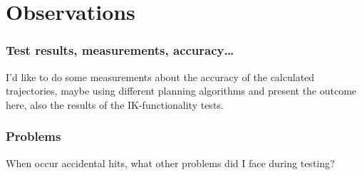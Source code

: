 
\chapter{Observations}

\subsection{Test results, measurements, accuracy\ldots}
I'd like to do some measurements about the accuracy of the calculated trajectories, maybe using different planning algorithms and present the outcome here, also the results of the IK-functionality tests.

\subsection{Problems}
When occur accidental hits, what other problems did I face during testing?
